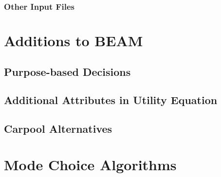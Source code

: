 \documentclass[12pt, oneside, openright]{byuthesis}
\begin{document}
\hypertarget{other-input-files}{%
\subsubsection{Other Input Files}\label{other-input-files}}

\hypertarget{mbeam}{%
\section{Additions to BEAM}\label{mbeam}}

\hypertarget{purpose-based-decisions}{%
\subsection{Purpose-based Decisions}\label{purpose-based-decisions}}

\hypertarget{additional-attributes-in-utility-equation}{%
\subsection{Additional Attributes in Utility Equation}\label{additional-attributes-in-utility-equation}}

\hypertarget{carpool-alternatives}{%
\subsection{Carpool Alternatives}\label{carpool-alternatives}}

\hypertarget{mode-choice-algorithms}{%
\section{Mode Choice Algorithms}\label{mode-choice-algorithms}}
\end{document}
